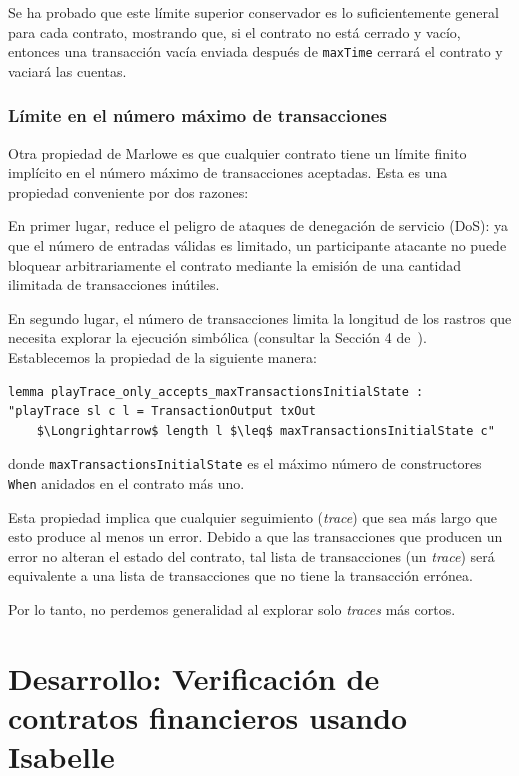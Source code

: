 \documentclass[12pt]{book}
\begin{document}
Se ha probado que este límite superior conservador es lo suficientemente general para cada contrato, mostrando que, si el contrato no está cerrado y vacío, entonces una transacción vacía enviada después de \texttt{maxTime} cerrará el contrato y vaciará las cuentas.

\subsection{Límite en el número máximo de transacciones}

Otra propiedad de Marlowe es que cualquier contrato tiene un límite finito implícito en el número máximo de transacciones aceptadas. Esta es una propiedad conveniente por dos razones:

En primer lugar, reduce el peligro de ataques de denegación de servicio (DoS): ya que el número de entradas válidas es limitado, un participante atacante no puede bloquear arbitrariamente el contrato mediante la emisión de una cantidad ilimitada de transacciones inútiles.

En segundo lugar, el número de transacciones limita la longitud de los rastros que necesita explorar la ejecución simbólica (consultar la Sección 4 de~\cite{implementing_financial_contracts_on_blockchain}). Establecemos la propiedad de la siguiente manera:

\begin{lstlisting}[style=Isabelle]
lemma playTrace_only_accepts_maxTransactionsInitialState :
"playTrace sl c l = TransactionOutput txOut
    $\Longrightarrow$ length l $\leq$ maxTransactionsInitialState c"
\end{lstlisting}

donde \texttt{maxTransactionsInitialState} es el máximo número de constructores \texttt{When} anidados en el contrato más uno.

Esta propiedad implica que cualquier seguimiento (\textit{trace}) que sea más largo que esto produce al menos un error. Debido a que las transacciones que producen un error no alteran el estado del contrato, tal lista de transacciones (un \textit{trace}) será equivalente a una lista de transacciones que no tiene la transacción errónea.

Por lo tanto, no perdemos generalidad al explorar solo \textit{traces} más cortos.



\chapter[Verificación de contratos financieros en Isabelle]{Desarrollo: Verificación de contratos financieros usando Isabelle}
\end{document}
